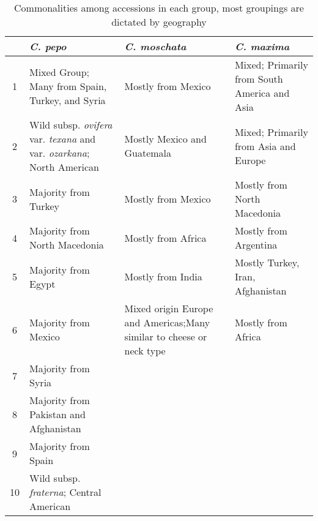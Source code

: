 \documentclass[utf8]{FrontiersinHarvard} %
\begin{document}
\begin{table}[h]
	\begin{tabular}{|c| p{4cm}| p{4cm} |p{4cm}|}
		\hline
& \emph{C. pepo} & \emph{C. moschata} & \emph{C. maxima} \\
\hline
1 & Mixed Group; Many from Spain, Turkey, and Syria & Mostly from Mexico & Mixed; Primarily from South America and Asia \\
\hline
2 & Wild subsp. \emph{ovifera} var. \emph{texana} and var. \emph{ozarkana}; North American & Mostly Mexico and Guatemala & Mixed; Primarily from Asia and Europe \\
\hline
3 & Majority from Turkey & Mostly from Mexico & Mostly from North Macedonia \\
\hline
4 & Majority from North Macedonia & Mostly from Africa & Mostly from Argentina \\
\hline
5 & Majority from Egypt & Mostly from India & Mostly Turkey, Iran, Afghanistan \\
\hline
6 & Majority from Mexico & Mixed origin Europe and Americas;Many similar to cheese or neck type & Mostly from Africa \\
\hline
7 & Majority from Syria & & \\
\hline
8 & Majority from Pakistan and Afghanistan & & \\
\hline
9 & Majority from Spain & & \\
\hline
10 & Wild subsp. \emph{fraterna}; Central American & & \\
\hline
	\end{tabular}
	\caption{Commonalities among accessions in each group, most groupings are dictated by geography \label{tbl:2}}
\end{table}

\newpage
\end{document}
